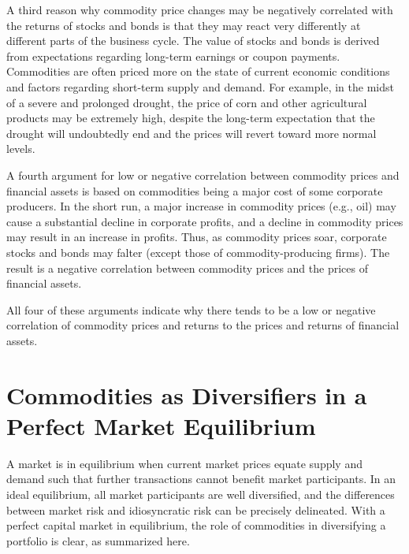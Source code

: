 \documentclass[11pt]{article}
\begin{document}
A third reason why commodity price changes may be negatively correlated with the returns of stocks and bonds is that they may react very differently at different parts of the business cycle. The value of stocks and bonds is derived from expectations regarding long-term earnings or coupon payments. Commodities are often priced more on the state of current economic conditions and factors regarding short-term supply and demand. For example, in the midst of a severe and prolonged drought, the price of corn and other agricultural products may be extremely high, despite the long-term expectation that the drought will undoubtedly end and the prices will revert toward more normal levels.

A fourth argument for low or negative correlation between commodity prices and financial assets is based on commodities being a major cost of some corporate producers. In the short run, a major increase in commodity prices (e.g., oil) may cause a substantial decline in corporate profits, and a decline in commodity prices may result in an increase in profits. Thus, as commodity prices soar, corporate stocks and bonds may falter (except those of commodity-producing firms). The result is a negative correlation between commodity prices and the prices of financial assets.

All four of these arguments indicate why there tends to be a low or negative correlation of commodity prices and returns to the prices and returns of financial assets.

\section*{Commodities as Diversifiers in a Perfect Market Equilibrium}
A market is in equilibrium when current market prices equate supply and demand such that further transactions cannot benefit market participants. In an ideal equilibrium, all market participants are well diversified, and the differences between market risk and idiosyncratic risk can be precisely delineated. With a perfect capital market in equilibrium, the role of commodities in diversifying a portfolio is clear, as summarized here.
\end{document}
